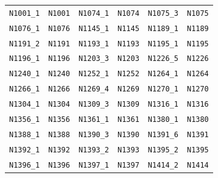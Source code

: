 \documentclass[11pt,a4paper]{article}
\begin{document}
\begin{longtable}{@{}llllll@{}}
\texttt{N1001\_1} & \texttt{N1001} & \texttt{N1074\_1} & \texttt{N1074} & \texttt{N1075\_3} & \texttt{N1075} \\
\texttt{N1076\_1} & \texttt{N1076} & \texttt{N1145\_1} & \texttt{N1145} & \texttt{N1189\_1} & \texttt{N1189} \\
\texttt{N1191\_2} & \texttt{N1191} & \texttt{N1193\_1} & \texttt{N1193} & \texttt{N1195\_1} & \texttt{N1195} \\
\texttt{N1196\_1} & \texttt{N1196} & \texttt{N1203\_3} & \texttt{N1203} & \texttt{N1226\_5} & \texttt{N1226} \\
\texttt{N1240\_1} & \texttt{N1240} & \texttt{N1252\_1} & \texttt{N1252} & \texttt{N1264\_1} & \texttt{N1264} \\
\texttt{N1266\_1} & \texttt{N1266} & \texttt{N1269\_4} & \texttt{N1269} & \texttt{N1270\_1} & \texttt{N1270} \\
\texttt{N1304\_1} & \texttt{N1304} & \texttt{N1309\_3} & \texttt{N1309} & \texttt{N1316\_1} & \texttt{N1316} \\
\texttt{N1356\_1} & \texttt{N1356} & \texttt{N1361\_1} & \texttt{N1361} & \texttt{N1380\_1} & \texttt{N1380} \\
\texttt{N1388\_1} & \texttt{N1388} & \texttt{N1390\_3} & \texttt{N1390} & \texttt{N1391\_6} & \texttt{N1391} \\
\texttt{N1392\_1} & \texttt{N1392} & \texttt{N1393\_2} & \texttt{N1393} & \texttt{N1395\_2} & \texttt{N1395} \\
\texttt{N1396\_1} & \texttt{N1396} & \texttt{N1397\_1} & \texttt{N1397} & \texttt{N1414\_2} & \texttt{N1414} \\
\end{longtable}
\endgroup

\end{document}
